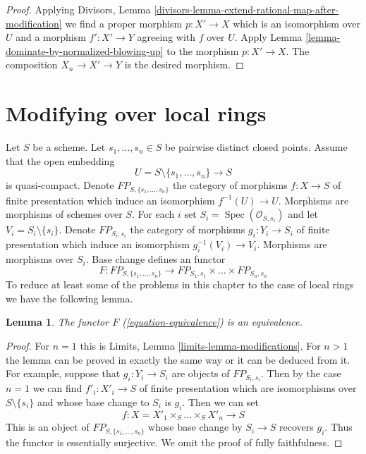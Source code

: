 \documentclass{stacks-project}
\theoremstyle{plain}
\newtheorem{lemma}[subsection]{Lemma}
\theoremstyle{definition}
\theoremstyle{remark}
\numberwithin{equation}{subsection}
\def\Spec{\mathop{\mathrm{Spec}}}
\begin{document}
\begin{proof}
Applying
Divisors, Lemma \ref{divisors-lemma-extend-rational-map-after-modification}
we find a proper morphism $p : X' \to X$ which is an isomorphism
over $U$ and a morphism $f' : X' \to Y$ agreeing with $f$ over $U$.
Apply Lemma \ref{lemma-dominate-by-normalized-blowing-up}
to the morphism $p : X' \to X$. The composition $X_n \to X' \to Y$ is
the desired morphism.
\end{proof}





\section{Modifying over local rings}
\label{section-modifications}

\noindent
Let $S$ be a scheme. Let $s_1, \ldots, s_n \in S$ be pairwise distinct
closed points. Assume that the open embedding
$$
U = S \setminus \{s_1, \ldots, s_n\} \longrightarrow S
$$
is quasi-compact. Denote $FP_{S, \{s_1, \ldots, s_n\}}$
the category of morphisms $f : X \to S$ of finite presentation
which induce an isomorphism $f^{-1}(U) \to U$.
Morphisms are morphisms of schemes over $S$.
For each $i$ set $S_i = \Spec(\mathcal{O}_{S, s_i})$
and let $V_i = S_i \setminus \{s_i\}$. Denote
$FP_{S_i, s_i}$ the category of
morphisms $g_i : Y_i \to S_i$ of finite presentation which induce an
isomorphism $g_i^{-1}(V_i) \to V_i$.
Morphisms are morphisms over $S_i$.
Base change defines an functor
\begin{equation}
\label{equation-equivalence}
F :
FP_{S, \{s_1, \ldots, s_n\}}
\longrightarrow
FP_{S_1, s_1} \times \ldots \times FP_{S_n, s_n}
\end{equation}
To reduce at least some of the problems in this chapter to the case
of local rings we have the following lemma.

\begin{lemma}
\label{lemma-equivalence}
The functor $F$ (\ref{equation-equivalence}) is an equivalence.
\end{lemma}

\begin{proof}
For $n = 1$ this is Limits, Lemma \ref{limits-lemma-modifications}.
For $n > 1$ the lemma can be proved in exactly the same way or it
can be deduced from it. For example, suppose that
$g_i : Y_i \to S_i$ are objects of $FP_{S_i, s_i}$.
Then by the case $n = 1$ we can find $f'_i : X'_i \to S$
of finite presentation
which are isomorphisms over $S \setminus \{s_i\}$ and whose
base change to $S_i$ is $g_i$. Then we can set
$$
f : X = X'_1 \times_S \ldots \times_S X'_n \to S
$$
This is an object of $FP_{S, \{s_1, \ldots, s_n\}}$
whose base change by $S_i \to S$ recovers $g_i$. Thus the functor
is essentially surjective. We omit the proof of
fully faithfulness.
\end{proof}
\end{document}

